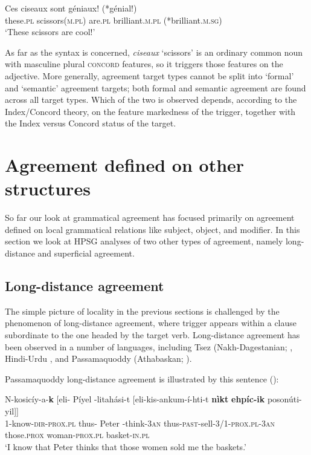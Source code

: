 \documentclass[output=paper]{langsci/langscibook}
\begin{document}
\begin{exe} 
\ex\label{ciseaux}
\gll   Ces	ciseaux	sont	g\'{e}niaux!	(*g\'{e}nial!) \\
		these.\textsc{pl}	scissors(\textsc{m.pl})	are.\textsc{pl} 	brilliant.\textsc{m.pl}	(*brilliant.\textsc{m.sg}) \\
\glt		‘These scissors are cool!’ 
\end{exe}

\noindent
As far as the syntax is concerned, \textit{ciseaux} ‘scissors’ is an ordinary common noun with masculine plural \textsc{concord} features, so it triggers those features on the adjective.  More generally, agreement target types cannot be split into `formal' and `semantic' agreement targets; both formal and semantic agreement are found across all target types.  Which of the two is observed depends, according to the Index/Concord theory,  on the feature markedness of the trigger, together with the Index versus Concord status of the target.  
 

\section{Agreement defined on other structures}
So far our look at grammatical agreement has focused primarily on agreement defined on local grammatical relations like subject, object, and modifier.  In this section we look at HPSG analyses of two other types of agreement, namely long-distance and superficial agreement.  

\subsection{Long-distance agreement}
\label{LDA}
The simple picture of locality in the previous sections is challenged by the phenomenon of long-distance agreement, where trigger appears within a clause subordinate to the one headed by the target verb.  Long-distance agreement has been observed in a number of languages, including Tsez (Nakh-Dagestanian; \citet{polinsky+potsdam:2001}, Hindi-Urdu \citep{bhatt:2005}, and Passamaquoddy (Athabaskan; \citet{bruening:2001,LeSourd:2018}).  

Passamaquoddy long-distance agreement is illustrated by this sentence (\citet[ex. 5]{LeSourd:2018}):

\begin{exe}
\ex\label{baskets}
\gll 	N-kosic\'{i}y-a-\textbf{k} [eli- P\'{i}yel -litah\'{a}si-t  [eli-kis-ankum-\'{i}-hti-t   \textbf{n\`{i}kt}  \textbf{ehp\'{i}c-ik}	poson\'{u}ti-yil]] \\
1-know-\textsc{dir-prox.pl} thus- Peter -think-\textsc{3an} thus-\textsc{past}-sell-\textsc{3/1-prox.pl-3an}         those.\textsc{prox}  woman-\textsc{prox.pl}     basket-\textsc{in.pl}\\
\glt ‘I know that Peter thinks that those women sold me the baskets.’
\end{exe}
\end{document}
